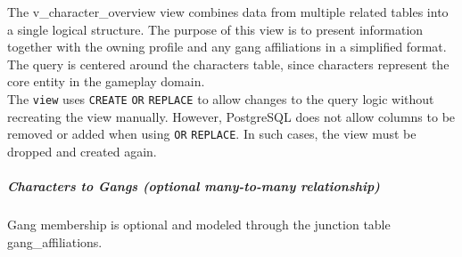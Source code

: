 \begin{Shaded}
\begin{Highlighting}[]
   
    \StringTok{\textquotesingle{}, \textquotesingle{}}\NormalTok{), }\NormalTok{) }
 \OperatorTok{=}
 \OperatorTok{=}
  \OperatorTok{=}
 
\end{Highlighting}
\end{Shaded}

The v\_character\_overview view combines data from multiple related
tables into a single logical structure. The purpose of this view is to
present information together with the owning profile and any gang
affiliations in a simplified format. The query is centered around the
characters table, since characters represent the core entity in the
gameplay domain.\\
The \texttt{view} uses \texttt{CREATE} \texttt{OR} \texttt{REPLACE} to
allow changes to the query logic without recreating the view manually.
However, PostgreSQL does not allow columns to be removed or added when
using \texttt{OR} \texttt{REPLACE}. In such cases, the view must be
dropped and created again.

\hypertarget{characters-to-gangs-optional-many-to-many-relationship}{%
\subparagraph{Characters to Gangs (optional many-to-many
relationship)}\label{characters-to-gangs-optional-many-to-many-relationship}}

Gang membership is optional and modeled through the junction table
gang\_affiliations.

